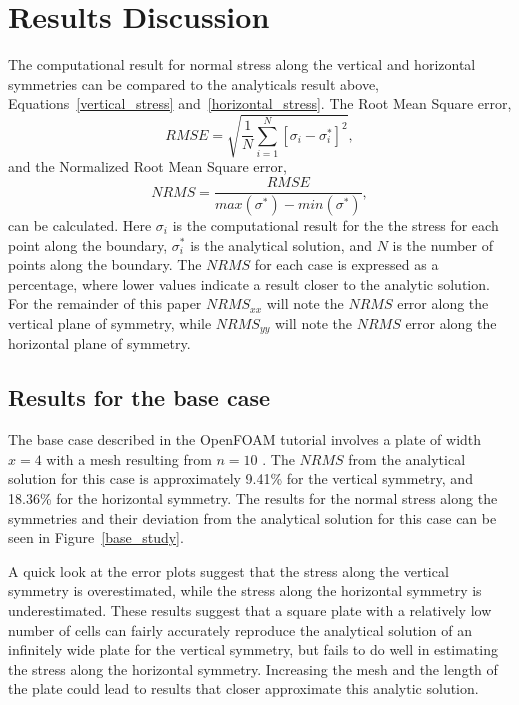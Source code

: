 \documentclass[twocolumn,10pt]{asme2ej}
\begin{document}
\section{Results Discussion}
The computational result for normal stress along the vertical and horizontal symmetries can be compared to the analyticals result above, Equations~\ref{vertical_stress} and~\ref{horizontal_stress}. The Root Mean Square error,
\begin{equation}
RMSE = \sqrt{\frac{1}{N}\sum\limits_{i=1}^N[\sigma_i - \sigma^*_i]^2},
\end{equation}
and the Normalized Root Mean Square error,
\begin{equation}
NRMS = \dfrac{RMSE}{max(\sigma^*)-min(\sigma^*)},
\end{equation}
can be calculated. Here $\sigma_i$ is the computational result for the the stress for each point along the boundary, $\sigma^*_i$ is the analytical solution, and $N$ is the number of points along the boundary. The $NRMS$ for each case is expressed as a percentage, where lower values indicate a result closer to the analytic solution. For the remainder of this paper $NRMS_{xx}$ will note the $NRMS$ error along the vertical plane of symmetry, while $NRMS_{yy}$ will note the $NRMS$ error along the horizontal plane of symmetry.

\subsection{Results for the base case}
The base case described in the OpenFOAM tutorial involves a plate of width $x = 4$ with a mesh resulting from $n = 10$ \cite{ctfm_1}. The $NRMS$ from the analytical solution for this case is approximately 9.41\% for the vertical symmetry, and 18.36\% for the horizontal symmetry. The results for the normal stress along the symmetries and their deviation from the analytical solution for this case can be seen in Figure~\ref{base_study}.

A quick look at the error plots suggest that the stress along the vertical symmetry is overestimated, while the stress along the horizontal symmetry is underestimated. These results suggest that a square plate with a relatively low number of cells can fairly accurately reproduce the analytical solution of an infinitely wide plate for the vertical symmetry, but fails to do well in estimating the stress along the horizontal symmetry. Increasing the mesh and the length of the plate could lead to results that closer approximate this analytic solution.
\end{document}

